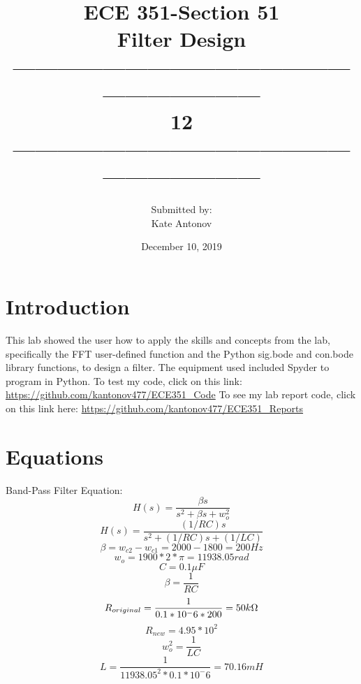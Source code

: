 \documentclass[12pt]{article}
\title{ECE 351-Section 51 \\ Filter Design
 \\ ------------------------------------------------------------------\\ 12 \\------------------------------------------------------------------}
\author{Submitted by: \\  Kate Antonov}
\date{December 10, 2019}
\begin{document}
\vspace{\fill}

\maketitle

\vspace{\fill}
\thispagestyle{empty}
\clearpage

\clearpage
\thispagestyle{empty}
\tableofcontents
\clearpage

\section{Introduction}
This lab showed the user how to apply the skills and concepts from the lab, specifically the FFT user-defined function and the Python sig.bode and con.bode library functions, to design a filter.
\newline
The equipment used included Spyder to program in Python. To test my code, click on this link: 
\url{https://github.com/kantonov477/ECE351_Code}
\newline
To see my lab report code, click on this link here: 
\url{https://github.com/kantonov477/ECE351_Reports}
\section{Equations}
Band-Pass Filter Equation:
\[H(s) = \frac {\beta s}{s^2 + \beta s + w_o^2}\]
\[H(s) = \frac{(1/RC)s}{s^2 + (1/RC)s + (1/LC)}\]
\[\beta = w_{c2} - w_{c1} = 2000 - 1800 = 200Hz\]
\[w_o = 1900*2*\pi = 11938.05 rad\]
\[C = 0.1 \mu F\]
\[\beta = \frac{1}{RC}\]
\[R_{original} = \frac{1}{0.1*10^-6*200} = 50k\ohm\]
\[R_{new} = 4.95*10^2\]
\[w_o^2 = \frac{1}{LC}\]
\[L = \frac{1}{11938.05^2 * 0.1*10^-6} = 70.16mH\]
\end{document}
